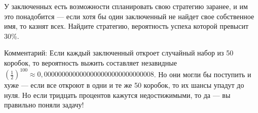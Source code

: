 У заключенных есть возможности спланировать свою стратегию заранее, и им это понадобится --- если хотя бы один заключенный не найдет свое собственное имя, то казнят всех.
Найдите стратегию, вероятность успеха которой превысит 30\%.

Комментарий: Если каждый заключенный откроет случайный набор из 50 коробок, то вероятность выжить составляет незавидные $(\tfrac12)^{100}\approx 0{,}0000000000000000000000000000008$.
Но они могли бы поступить и хуже --- если все откроют в одни и те же 50 коробок, то их шансы упадут до нуля. Но если тридцать процентов кажутся недостижимыми, то да --- вы правильно поняли задачу!
